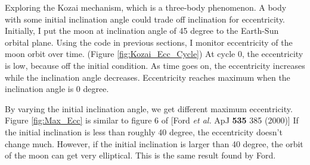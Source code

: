 \documentclass[11pt,letterpaper]{article}
\begin{document}
Exploring the Kozai mechanism, which is a three-body phenomenon. A body with some initial inclination angle could trade off inclination for eccentricity. Initially, I put the moon at inclination angle of 45 degree to the Earth-Sun orbital plane. Using the code in previous sections, I monitor eccentricity of the moon orbit over time. (Figure \ref{fig:Kozai_Ecc_Cycle}) At cycle 0, the eccentricity is low, because off the initial condition. As time goes on, the eccentricity increases while the inclination angle decreases. Eccentricity reaches maximum when the inclination angle is 0 degree.

By varying the initial inclination angle, we get different maximum eccentricity. Figure \ref{fig:Max_Ecc} is similar to figure 6 of [Ford \emph{et al.} ApJ \textbf{535} 385 (2000)] If the initial inclination is less than roughly 40 degree, the eccentricity doesn't change much. However, if the initial inclination is larger than 40 degree, the orbit of the moon can get very elliptical. This is the same result found by Ford.
\end{document}

